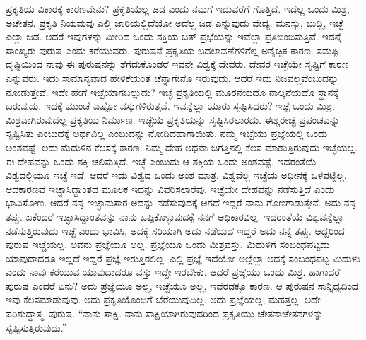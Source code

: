 ಪ್ರಕೃತಿಯ ವಿಕಾರಕ್ಕೆ ಕಾರಣವೇನು? ಪ್ರಕೃತಿಯೆಲ್ಲ ಜಡ ಎಂದು ನಮಗೆ ಇದುವರೆಗೆ ಗೊತ್ತಿದೆ. ಇದೆಲ್ಲ ಒಂದು ಮಿಶ್ರ, ಅಚೇತನ. ಪ್ರಕೃತಿ ನಿಯಮವು ಎಲ್ಲಿ ಜಾರಿಯಲ್ಲಿದೆಯೋ ಅದೆಲ್ಲ ಜಡ ಎನ್ನುವುದು ವೇದ್ಯ. ಮನಸ್ಸು, ಬುದ್ಧಿ, ಇಚ್ಛೆ ಎಲ್ಲಾ ಜಡ. ಆದರೆ ಇವುಗಳನ್ನು ಮೀರಿದ ಒಂದು ಶಕ್ತಿಯ ಚಿತ್ ಪ್ರಭೆಯನ್ನು ಇವೆಲ್ಲಾ ಪ್ರತಿಬಿಂಬಿಸುತ್ತಿವೆ. ಇದನ್ನೆ ಸಾಂಖ್ಯರು ಪುರುಷ ಎಂದು ಕರೆಯುವರು. ಪುರುಷನೆ ಪ್ರಕೃತಿಯ ಬದಲಾವಣೆಗಳಿಗೆಲ್ಲ ಅನೈಚ್ಛಿಕ ಕಾರಣ. ಸಮಷ್ಟಿ ದೃಷ್ಟಿಯಿಂದ ನಾವು ಈ ಪುರುಷನನ್ನು ತೆಗೆದುಕೊಂಡರೆ ಇವನೇ ವಿಶ್ವಕ್ಕೆ ದೇವರು. ದೇವರ ಇಚ್ಚೆಯೇ ಸೃಷ್ಟಿಗೆ ಕಾರಣ ಎನ್ನುವರು. ಇದು ಸಾಮಾನ್ಯವಾದ ಹೇಳಿಕೆಯಂತೆ ಚೆನ್ನಾಗೇನೊ ಇರುವುದು. ಆದರೆ ಇದು ನಿಜವಲ್ಲವೆಂಬುದನ್ನು ನೋಡುತ್ತೇವೆ. ಇದೇ ಹೇಗೆ ಇಚ್ಛೆಯಾಗಬಲ್ಲುದು? ಇಚ್ಛೆ ಪ್ರಕೃತಿಯಲ್ಲಿ ಮೂರನೆಯದೊ ನಾಲ್ಕನೆಯದೊ ಸ್ಥಾನಕ್ಕೆ ಬರುವುದು. ಇದಕ್ಕೆ ಮುಂಚೆ ಎಷ್ಟೋ ವಸ್ತುಗಳಿರುತ್ತವೆ. ಇವನ್ನೆಲ್ಲಾ ಯಾರು ಸೃಷ್ಟಿಸಿದರು? ಇಚ್ಛೆ ಒಂದು ಮಿಶ್ರ. ಮಿಶ್ರವಾಗಿರುವುದೆಲ್ಲ ಪ್ರಕೃತಿಯ ನಿರ್ಮಾಣ. ಇಚ್ಛೆಯೆ ಪ್ರಕೃತಿಯನ್ನು ಸೃಷ್ಟಿಸಿರಲಾರದು. ಈಶ್ಚರೇಚ್ಛೆ ಪ್ರಪಂಚವನ್ನು ಸೃಷ್ಟಿಸಿತು ಎಂಬುದಕ್ಕೆ ಅರ್ಥವಿಲ್ಲ ಎಂಬುದನ್ನು ನೋಡಿದಹಾಗಾಯಿತು. ನಮ್ಮ ಇಚ್ಛೆಯು ಪ್ರಜ್ಞೆಯಲ್ಲಿ ಒಂದು ಅಂಶವಷ್ಟೆ. ಅದು ಮೆದುಳಿನ ಕೆಲಸಕ್ಕೆ ಕಾರಣ. ನಿಮ್ಮ ದೇಹ ಅಥವಾ ಜಗತ್ತಿನಲ್ಲಿ ಕೆಲಸ ಮಾಡುತ್ತಿರುವುದು ಇಚ್ಛೆಯಲ್ಲ. ಈ ದೇಹವನ್ನು ಒಂದು ಶಕ್ತಿ ಚಲಿಸುತ್ತಿದೆ. ಇಚ್ಛೆ ಎಂಬುದು ಆ ಶಕ್ತಿಯ ಒಂದು ಅಂಶವಷ್ಟೆ. ಇದರಂತೆಯೆ ವಿಶ್ವದಲ್ಲಿಯೂ ಇಚ್ಛೆ ಇದೆ. ಆದರೆ ಇದು ವಿಶ್ವದ ಒಂದು ಅಂಶ ಮಾತ್ರ. ವಿಶ್ವವೆಲ್ಲ ಇಚ್ಛೆಯ ಅಧೀನಕ್ಕೆ ಒಳಪಟ್ಟಿಲ್ಲ. ಆದಕಾರಣವೆ ಇಚ್ಛಾಸಿದ್ಧಾಂತದ ಮೂಲಕ ಇದನ್ನು ವಿವರಿಸಲಾರೆವು. ಇಚ್ಛೆಯೇ ದೇಹವನ್ನು ನಡೆಸುತ್ತಿದೆ ಎಂದು ಭಾವಿಸೋಣ. ಆದರೆ ನನ್ನ ಇಚ್ಛಾನುಸಾರ ಅದನ್ನು ನಡೆಸುವುದಕ್ಕೆ ಆಗದೆ ಇದ್ದರೆ ನಾನು ಗೊಣಗಾಡುತ್ತೇನೆ. ಅದು ನನ್ನ ತಪ್ಪು. ಏಕೆಂದರೆ ಇಚ್ಛಾಸಿದ್ದಾಂತವನ್ನು ನಾನು ಒಪ್ಪಿಕೊಳ್ಳುವುದಕ್ಕೆ ನನಗೆ ಅಧಿಕಾರವಿಲ್ಲ. ಇದರಂತೆಯೆ ವಿಶ್ವವನ್ನೆಲ್ಲಾ ನಡೆಸುತ್ತಿರುವುದು ಇಚ್ಛೆ ಎಂದು ಭಾವಿಸಿ, ಅದಕ್ಕೆ ಸರಿಯಾಗಿ ಅದು ನಡೆಯದೆ ಇದ್ದರೆ ಅದು ನನ್ನ ತಪ್ಪು. ಆದ್ದರಿಂದ ಪುರುಷ ಇಚ್ಚೆಯಲ್ಲ. ಅವನು ಪ್ರಜ್ಞೆಯೂ ಅಲ್ಲ. ಪ್ರಜ್ಞೆಯೂ ಒಂದು ಮಿಶ್ರವಸ್ತು. ಮಿದುಳಿಗೆ ಸಂಬಂಧಪಟ್ಟದು ಯಾವುದಾದರೂ ಇಲ್ಲದೆ ಇದ್ದರೆ ಪ್ರಜ್ಞೆ ಇರುತ್ತಿರಲಿಲ್ಲ. ಎಲ್ಲಿ ಪ್ರಜ್ಞೆ ಇದೆಯೋ ಅಲ್ಲೆಲ್ಲಾ ಅದಕ್ಕೆ ಸಂಬಂಧಪಟ್ಟ ಮಿದುಳು ಎಂದು ನಾವು ಕರೆಯುವ ಯಾವುದಾದರೂ ವಸ್ತು ಇದ್ದೇ ಇರಬೇಕು. ಆದರೆ ಪ್ರಜ್ಞೆಯು ಒಂದು ಮಿಶ್ರ. ಹಾಗಾದರೆ ಪುರುಷ ಎಂದರೆ ಏನು? ಅದು ಪ್ರಜ್ಞೆಯೂ ಅಲ್ಲ, ಇಚ್ಛೆಯೂ ಅಲ್ಲ, ಇವೆರಡಕ್ಕೂ ಕಾರಣ. ಆ ಪುರುಷನ ಸಾನ್ನಿಧ್ಯದಿಂದ ಇವು ಕೆಲಸಮಾಡುವುವು. ಅದು ಪ್ರಕೃತಿಯೊಂದಿಗೆ ಬೆರೆಯುವುದಿಲ್ಲ. ಅದು ಪ್ರಜ್ಞೆಯಲ್ಲ, ಮಹತ್ತಲ್ಲ, ಅದೇ ಪರಿಶುದ್ಧಾತ್ಮ, ಪುರುಷ. “ನಾನು ಸಾಕ್ಷಿ. ನಾನು ಸಾಕ್ಷಿಯಾಗಿರುವುದರಿಂದ ಪ್ರಕೃತಿಯು ಚೇತನಾಚೇತನಗಳನ್ನು ಸೃಷ್ಟಿಸುತ್ತಿರುವುದು.”

